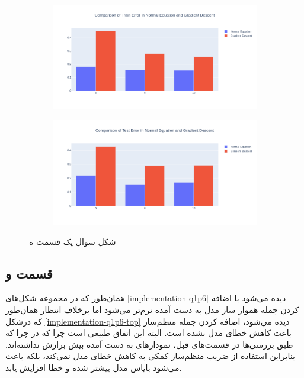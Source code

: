 \documentclass[14pt,a4]{article}
\begin{document}
\begin{figure}[h]
    \centering
    \begin{subfigure}{0.45\linewidth}
        \centering
        \includegraphics[width=\textwidth]{images/implementation/q1/part_e/train.png}
    \end{subfigure}
    \hfill
    \begin{subfigure}{0.45\textwidth}
        \centering
        \includegraphics[width=\textwidth]{images/implementation/q1/part_e/test.png}
    \end{subfigure}
    \caption{شکل سوال یک قسمت ه}
    \label{implementation-q1p5}
\end{figure}

\subsection*{قسمت و}

همان‌طور که در مجموعه شکل‌های \ref{implementation-q1p6} دیده می‌شود با اضافه کردن جمله هموار ساز مدل
به دست آمده نرم‌تر می‌شود اما برخلاف انتظار همان‌طور که درشکل \ref{implementation-q1p6-top}
دیده می‌شود، اضافه کردن جمله منظم‌ساز باعث کاهش خطای مدل نشده است.
البته این اتفاق طبیعی است چرا که در  چرا که طبق بررسی‌ها در قسمت‌های قبل، نمودار‌های به دست
آمده بیش برازش نداشته‌اند. بنابراین استفاده از ضریب منظم‌ساز کمکی به کاهش خطای مدل نمی‌کند،
بلکه باعث می‌شود بایاس مدل بیشتر شده و خطا افزایش یابد.
\end{document}
